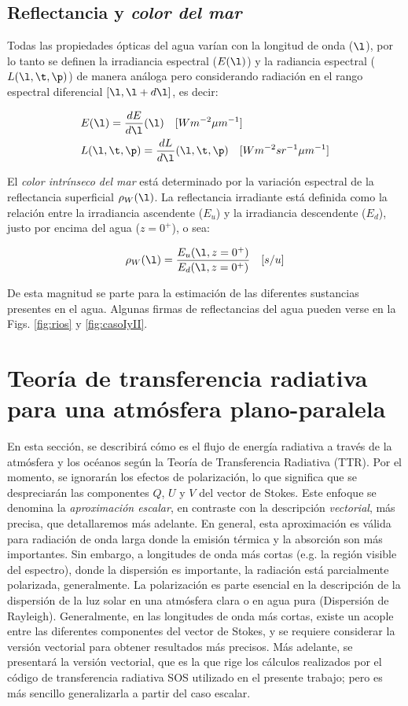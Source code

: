 \subsection{Reflectancia y \textit{color del mar}}
Todas las propiedades ópticas del agua varían con la longitud de onda ($\l$), por lo tanto se definen la irradiancia espectral ($E(\l)$) y la radiancia espectral ($L(\l,\t,\p)$) de manera análoga pero considerando radiación en el rango espectral diferencial $[\l,\l+d\l]$, es decir:

\begin{align}
 &E(\l)=\frac{d E}{d\l}(\l) \quad [W m^{-2} \mu m^{-1}] \\
 &L(\l,\t,\p)=\frac{d L}{d\l}(\l,\t,\p) \quad [W m^{-2} sr^{-1} \mu m^{-1}]
\label{lambertiana}
 \end{align}

El \textit{color intrínseco del mar} está determinado por la variación espectral de la
reflectancia superficial $\rho_{W}(\l)$. La reflectancia irradiante está definida como la relación
entre la irradiancia ascendente ($E_{u}$) y la irradiancia descendente ($E_{d}$), justo por encima del agua ($z=0^{+}$), o sea:

\begin{equation}
\rho_{W}(\l)=\frac{E_{u}(\l,z=0^{+})}{E_{d}(\l,z=0^{+})} \quad [s/u]
\label{reflectancia}
\end{equation}

De esta magnitud se parte para la estimación de las diferentes sustancias presentes en el agua. Algunas firmas de reflectancias del agua pueden verse en la Figs. \ref{fig:rios} y \ref{fig:casoIyII}.

\section{Teoría de transferencia radiativa para una atmósfera plano-paralela}
En esta sección, se describirá cómo es el flujo de energía radiativa a través de la atmósfera y los océanos según la Teoría de Transferencia Radiativa (TTR). Por el momento, se ignorarán los efectos de polarización, lo que significa que se despreciarán las componentes $Q$, $U$ y $V$ del vector de Stokes.
Este enfoque se denomina la \textit{aproximación escalar}, en contraste con la descripción \textit{vectorial}, más precisa, que detallaremos más adelante.
En general, esta aproximación es válida para radiación de onda larga donde la emisión térmica
y la absorción son más importantes. Sin embargo, a longitudes de onda más cortas (e.g. la región
visible del espectro), donde la dispersión es importante, la radiación está parcialmente polarizada, generalmente. La polarización es parte esencial en la descripción de la dispersión de la luz solar en una atmósfera clara o en agua pura (Dispersión de Rayleigh). Generalmente, en las longitudes de onda más cortas, existe un acople entre las diferentes componentes del vector de Stokes, y se requiere considerar la versión vectorial para obtener resultados más precisos. Más adelante, se presentará la versión vectorial, que es la que rige los cálculos realizados por el código de transferencia radiativa SOS utilizado en el presente trabajo; pero es más sencillo generalizarla a partir del caso escalar.

